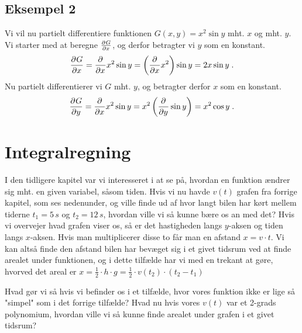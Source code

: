 \subsection{Eksempel 2}
Vi vil nu partielt differentiere funktionen $G(x,y) = x^2 \sin y$
mht. $x$ og mht. $y$. Vi starter med at beregne $\pdif{x}{G}$, og
derfor betragter vi $y$ som en konstant.
\[
\pdif{x}{G} = \pdif{x}{} x^2 \sin y
= \left(\pdif{x}{} x^2 \right) \sin y = 2 x \sin y \; .
\]
Nu partielt differentierer vi $G$ mht. $y$, og betragter derfor $x$ som en
konstant.
\[
\pdif{y}{G} = \pdif{x}{} x^2 \sin y
= x^2 \left(\pdif{y}{} \sin y \right) = x^2 \cos y \; .
\]



\section{Integralregning}
I den tidligere kapitel var vi interesseret i at se på, hvordan en
funktion ændrer sig mht. en given variabel, såsom tiden. Hvis vi
nu havde $v(t)$ grafen fra forrige kapitel, som ses nedenunder, og
ville finde ud af hvor langt bilen har kørt mellem tiderne
$t_1=5\, s$ og $t_2 = 12\,s$, hvordan ville vi så kunne bære os an
med det? Hvis vi overvejer hvad grafen viser os, så er det hastigheden
langs $y$-aksen og tiden langs $x$-aksen. Hvis man multiplicerer disse to
får man en afstand $x = v\cdot t$. Vi kan altså finde den afstand bilen
har bevæget sig i et givet tidsrum ved at finde arealet under funktionen,
og i dette tilfælde har vi med en trekant at gøre, hvorved det areal er
$x=\frac{1}{2}\cdot h \cdot g = \frac{1}{2} \cdot v(t_2) \cdot (t_2 - t_1)$

\begin{center}
\end{center}
Hvad gør vi så hvis vi befinder os i et tilfælde, hvor vores funktion ikke er
lige så "simpel" som i det forrige tilfælde? Hvad nu hvis vores $v(t)$ var et
2-grads polynomium, hvordan ville vi så kunne finde arealet under grafen i et
givet tidsrum?


